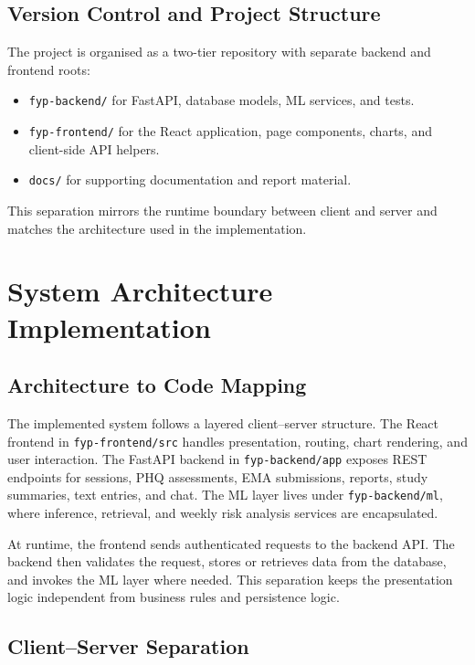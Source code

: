 \subsection{Version Control and Project Structure}

The project is organised as a two-tier repository with separate backend and frontend roots:

\begin{itemize}
  \item \texttt{fyp-backend/} for FastAPI, database models, ML services, and tests.
  \item \texttt{fyp-frontend/} for the React application, page components, charts, and client-side API helpers.
  \item \texttt{docs/} for supporting documentation and report material.
\end{itemize}

This separation mirrors the runtime boundary between client and server and matches the architecture used in the implementation.

\section{System Architecture Implementation}

\subsection{Architecture to Code Mapping}

The implemented system follows a layered client--server structure. The React frontend in \texttt{fyp-frontend/src} handles presentation, routing, chart rendering, and user interaction. The FastAPI backend in \texttt{fyp-backend/app} exposes REST endpoints for sessions, PHQ assessments, EMA submissions, reports, study summaries, text entries, and chat. The ML layer lives under \texttt{fyp-backend/ml}, where inference, retrieval, and weekly risk analysis services are encapsulated.

At runtime, the frontend sends authenticated requests to the backend API. The backend then validates the request, stores or retrieves data from the database, and invokes the ML layer where needed. This separation keeps the presentation logic independent from business rules and persistence logic.

\subsection{Client--Server Separation}

